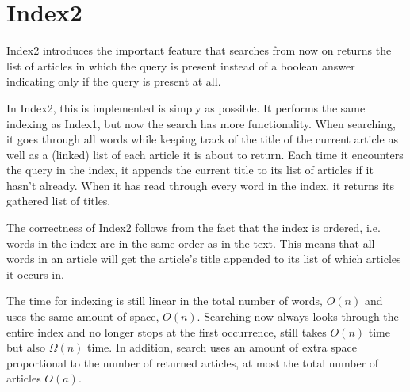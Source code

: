 \section{Index2}
\label{section:Index2}

Index2 introduces the important feature that searches from now on returns the list of articles in which the query is present instead of a boolean answer indicating only if the query is present at all. 

In Index2, this is implemented is simply as possible. It performs the same indexing as Index1, but now the search has more functionality. When searching, it goes through all words while keeping track of the title of the current article as well as a (linked) list of each article it is about to return. Each time it encounters the query in the index, it appends the current title to its list of articles if it hasn't already. When it has read through every word in the index, it returns its gathered list of titles. 

The correctness of Index2 follows from the fact that the index is ordered, i.e. words in the index are in the same order as in the text. This means that all words in an article will get the article's title appended to its list of which articles it occurs in. 

The time for indexing is still linear in the total number of words, $O(n)$ and uses the same amount of space, $O(n)$. Searching now always looks through the entire index and no longer stops at the first occurrence, still takes $O(n)$ time but also $\Omega(n)$ time. In addition, search uses an amount of extra space proportional to the number of returned articles, at most the total number of articles $O(a)$. 
